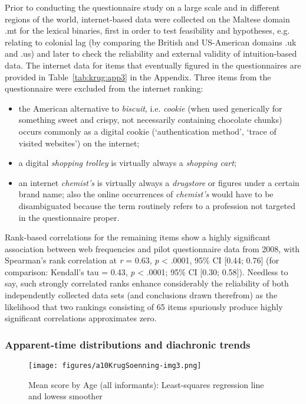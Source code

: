 \documentclass[output=paper]{langsci/langscibook}
\begin{document}
Prior to conducting the questionnaire study on a large scale and in different regions of the world, internet-based data were collected on the Maltese domain .mt for the lexical binaries, first in order to test feasibility and hypotheses, e.g. relating to colonial lag (by comparing the British and US-American domains .uk and .us) and later to check the reliability and external validity of intuition-based data. The internet data for items that eventually figured in the questionnaires are provided in Table~\ref{tab:krug:app3} %
in the Appendix. Three items from the questionnaire were excluded from the internet ranking: 

\begin{itemize}
\item 
the American alternative to \textit{biscuit}, i.e. \textit{cookie} (when used generically for something sweet and crispy, not necessarily containing chocolate chunks) occurs commonly as a digital cookie (‘authentication method’, ‘trace of visited websites’) on the internet; 
\item 
a digital \textit{shopping trolley} is virtually always a \textit{shopping cart};
\item 
an internet \textit{chemist’s} is virtually always a \textit{drugstore} or figures under a certain brand name; also the online occurrences of \textit{chemist’s} would have to be disambiguated because the term routinely refers to a profession not targeted in the questionnaire proper.
\end{itemize}

Rank-based correlations for the remaining items show a highly significant association between web frequencies and pilot questionnaire data from 2008, with Spearman’s rank correlation at \textit{r} = 0.63, \textit{p} < .0001, 95\% CI [0.44; 0.76] (for comparison: Kendall’s tau = 0.43, \textit{p} < .0001; 95\% CI [0.30; 0.58]). Needless to say, such strongly correlated ranks enhance considerably the reliability of both independently collected data sets (and conclusions drawn therefrom) as the likelihood that two rankings consisting of 65 items spuriously produce highly significant correlations approximates zero.

\subsubsection{Apparent-time distributions and diachronic trends}


\begin{figure}  
\texttt{[image: figures/a10KrugSoenning-img3.png]}
\caption{Mean score by Age (all informants): Least-squares regression line and lowess smoother}
\label{fig:krug:3}
\end{figure}
\end{document}
